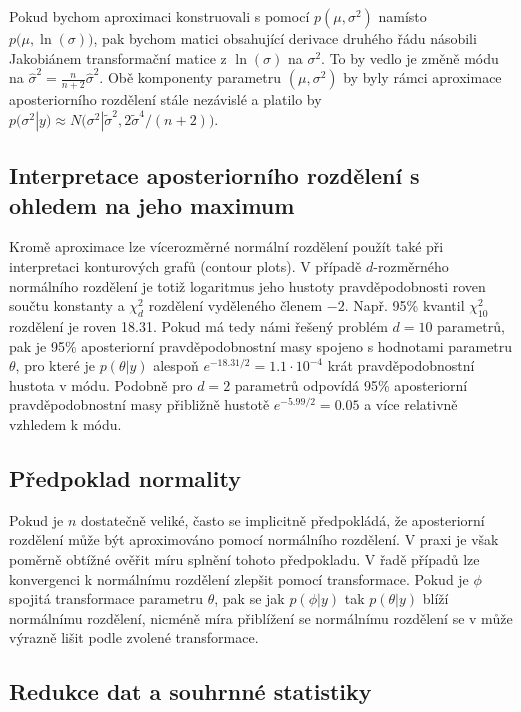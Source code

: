 Pokud bychom aproximaci konstruovali s pomocí $p(\mu, \sigma^2)$ namísto $p\big(\mu, \ln(\sigma)\big)$, pak bychom matici obsahující derivace druhého řádu násobili Jakobiánem transformační matice z $\ln(\sigma)$ na $\sigma^2$. To by vedlo je změně módu na $\hat{\sigma}^2 = \frac{n}{n + 2}\hat{\sigma}^2$. Obě komponenty parametru $(\mu, \sigma^2)$ by byly rámci aproximace aposteriorního rozdělení stále nezávislé a platilo by $p(\sigma^2 | y) \approx N\big(\sigma^2| \tilde{\sigma}^2, 2 \tilde{\sigma}^4 / (n + 2)\big)$.

\subsection{Interpretace aposteriorního rozdělení s ohledem na jeho maximum}

Kromě aproximace lze vícerozměrné normální rozdělení použít také při interpretaci konturových grafů (contour plots). V případě $d$-rozměrného normálního rozdělení je totiž logaritmus jeho hustoty pravděpodobnosti roven součtu konstanty a $\chi_d^2$ rozdělení vyděleného členem $-2$. Např. 95\% kvantil $\chi_{10}^2$ rozdělení je roven 18.31. Pokud má tedy námi řešený problém $d = 10$ parametrů, pak je 95\% aposteriorní pravděpodobnostní masy spojeno s hodnotami parametru $\theta$, pro které je $p(\theta|y)$ alespoň $e^{-18.31 / 2} = 1.1 \cdot 10^{-4}$ krát pravděpodobnostní hustota v módu. Podobně pro $d = 2$ parametrů odpovídá 95\% aposteriorní pravděpodobnostní masy přibližně hustotě $e^{-5.99 / 2} = 0.05$ a více relativně vzhledem k módu.

\subsection{Předpoklad normality}

Pokud je $n$ dostatečně veliké, často se implicitně předpokládá, že aposteriorní rozdělení může být aproximováno pomocí normálního rozdělení. V praxi je však poměrně obtížné ověřit míru splnění tohoto předpokladu. V řadě případů lze konvergenci k normálnímu rozdělení zlepšit pomocí transformace. Pokud je $\phi$ spojitá transformace parametru $\theta$, pak se jak $p(\phi | y)$ tak $p(\theta | y)$ blíží normálnímu rozdělení, nicméně míra přiblížení se normálnímu rozdělení se v může výrazně lišit podle zvolené transformace.

\subsection{Redukce dat a souhrnné statistiky}

